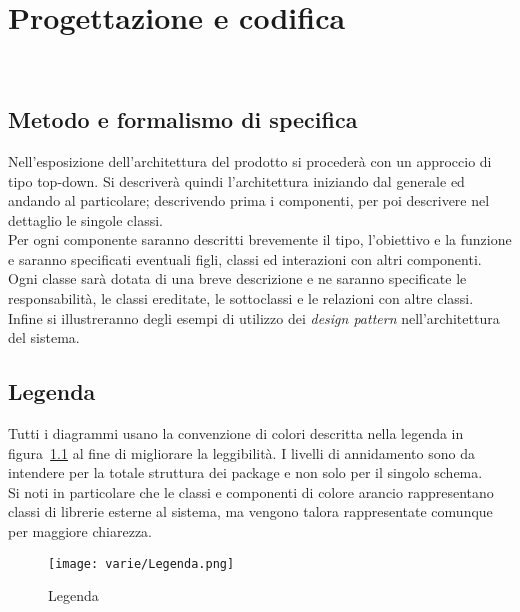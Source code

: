 
\chapter{Progettazione e codifica}
\label{cap:progettazione-codifica}

\\


\section{Metodo e formalismo di specifica}
Nell'esposizione dell'architettura del prodotto si procederà con un approccio di tipo top-down.  Si descriverà quindi l'architettura iniziando dal generale ed andando al particolare; descrivendo prima i componenti, per poi descrivere nel dettaglio le singole classi.\\
Per ogni componente saranno descritti brevemente il tipo, l'obiettivo e la funzione e saranno specificati
eventuali figli, classi ed interazioni con altri componenti. Ogni classe sarà dotata di una breve descrizione e
ne saranno specificate le responsabilità, le classi ereditate, le sottoclassi e le relazioni con altre classi.\\
Infine si illustreranno degli esempi di utilizzo dei \emph{design pattern} nell'architettura del sistema.

\section{Legenda}
Tutti i diagrammi usano la convenzione di colori descritta nella legenda in figura~\ref{fig:legenda} al fine di migliorare la leggibilità. I livelli di annidamento sono da intendere per la totale struttura dei package e non solo per il singolo schema.\\
Si noti in particolare che le classi e componenti di colore arancio rappresentano classi di librerie esterne al sistema, ma vengono talora rappresentate comunque per maggiore chiarezza.
\begin{figure}[H] 
    \centering 
    \texttt{[image: varie/Legenda.png]} 
    \caption{Legenda}\label{fig:legenda}
\end{figure}



